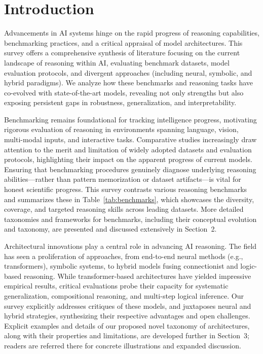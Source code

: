 \documentclass[sigconf]{acmart}
\begin{document}
\section{Introduction}

Advancements in AI systems hinge on the rapid progress of reasoning capabilities, benchmarking practices, and a critical appraisal of model architectures. This survey offers a comprehensive synthesis of literature focusing on the current landscape of reasoning within AI, evaluating benchmark datasets, model evaluation protocols, and divergent approaches (including neural, symbolic, and hybrid paradigms). We analyze how these benchmarks and reasoning tasks have co-evolved with state-of-the-art models, revealing not only strengths but also exposing persistent gaps in robustness, generalization, and interpretability.

Benchmarking remains foundational for tracking intelligence progress, motivating rigorous evaluation of reasoning in environments spanning language, vision, multi-modal inputs, and interactive tasks. Comparative studies increasingly draw attention to the merit and limitation of widely adopted datasets and evaluation protocols, highlighting their impact on the apparent progress of current models. Ensuring that benchmarking procedures genuinely diagnose underlying reasoning abilities---rather than pattern memorization or dataset artifacts---is vital for honest scientific progress. This survey contrasts various reasoning benchmarks and summarizes these in Table~\ref{tab:benchmarks}, which showcases the diversity, coverage, and targeted reasoning skills across leading datasets. More detailed taxonomies and frameworks for benchmarks, including their conceptual evolution and taxonomy, are presented and discussed extensively in Section~2.

Architectural innovations play a central role in advancing AI reasoning. The field has seen a proliferation of approaches, from end-to-end neural methods (e.g., transformers), symbolic systems, to hybrid models fusing connectionist and logic-based reasoning. While transformer-based architectures have yielded impressive empirical results, critical evaluations probe their capacity for systematic generalization, compositional reasoning, and multi-step logical inference. Our survey explicitly addresses critiques of these models, and juxtaposes neural and hybrid strategies, synthesizing their respective advantages and open challenges. Explicit examples and details of our proposed novel taxonomy of architectures, along with their properties and limitations, are developed further in Section~3; readers are referred there for concrete illustrations and expanded discussion.
\end{document}
